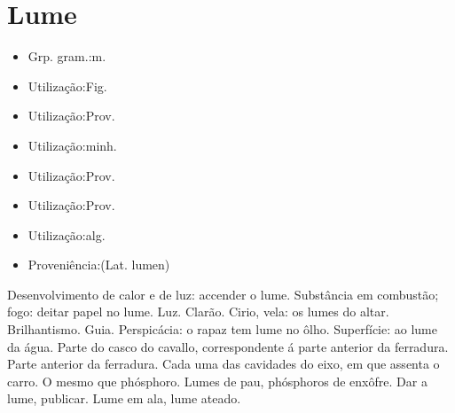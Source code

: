 \section{Lume}
\begin{itemize}
\item {Grp. gram.:m.}
\end{itemize}
\begin{itemize}
\item {Utilização:Fig.}
\end{itemize}
\begin{itemize}
\item {Utilização:Prov.}
\end{itemize}
\begin{itemize}
\item {Utilização:minh.}
\end{itemize}
\begin{itemize}
\item {Utilização:Prov.}
\end{itemize}
\begin{itemize}
\item {Utilização:Prov.}
\end{itemize}
\begin{itemize}
\item {Utilização:alg.}
\end{itemize}
\begin{itemize}
\item {Proveniência:(Lat. \textunderscore lumen\textunderscore )}
\end{itemize}
Desenvolvimento de calor e de luz: \textunderscore accender o lume\textunderscore .
Substância em combustão; fogo: \textunderscore deitar papel no lume\textunderscore .
Luz.
Clarão.
Cirio, vela: \textunderscore os lumes do altar\textunderscore .
Brilhantismo.
Guia.
Perspicácia: \textunderscore o rapaz tem lume no ôlho\textunderscore .
Superfície: \textunderscore ao lume da água\textunderscore .
Parte do casco do cavallo, correspondente á parte anterior da ferradura.
Parte anterior da ferradura.
Cada uma das cavidades do eixo, em que assenta o carro.
O mesmo que phósphoro.
\textunderscore Lumes de pau\textunderscore , phósphoros de enxôfre.
\textunderscore Dar a lume\textunderscore , publicar.
\textunderscore Lume em ala\textunderscore , lume ateado.
